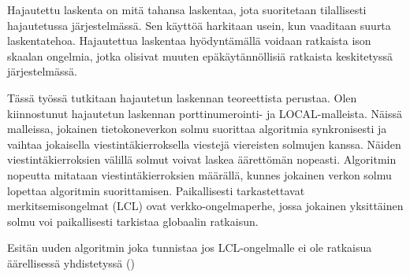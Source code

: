 \begin{abstractpage}[finnish]
Hajautettu laskenta on mitä tahansa laskentaa, jota suoritetaan tilallisesti hajautetussa järjestelmässä.
Sen käyttöä harkitaan usein, kun vaaditaan suurta laskentatehoa.
Hajautettua laskentaa hyödyntämällä voidaan ratkaista ison skaalan ongelmia, jotka olisivat muuten epäkäytännöllisiä ratkaista keskitetyssä järjestelmässä.

Tässä työssä tutkitaan hajautetun laskennan teoreettista perustaa.
Olen kiinnostunut hajautetun laskennan porttinumerointi- ja LOCAL-malleista.
Näissä malleissa, jokainen tietokoneverkon solmu suorittaa algoritmia synkronisesti ja vaihtaa jokaisella viestintäkierroksella viestejä viereisten solmujen kanssa.
Näiden viestintäkierroksien välillä solmut voivat laskea äärettömän nopeasti.
Algoritmin nopeutta mitataan viestintäkierroksien määrällä, kunnes jokainen verkon solmu lopettaa algoritmin suorittamisen.
Paikallisesti tarkastettavat merkitsemisongelmat (LCL) ovat verkko-ongelmaperhe, jossa jokainen yksittäinen solmu voi paikallisesti tarkistaa globaalin ratkaisun.

Esitän uuden algoritmin joka tunnistaa jos LCL-ongelmalle ei ole ratkaisua äärellisessä yhdistetyssä ()
\end{abstractpage}
